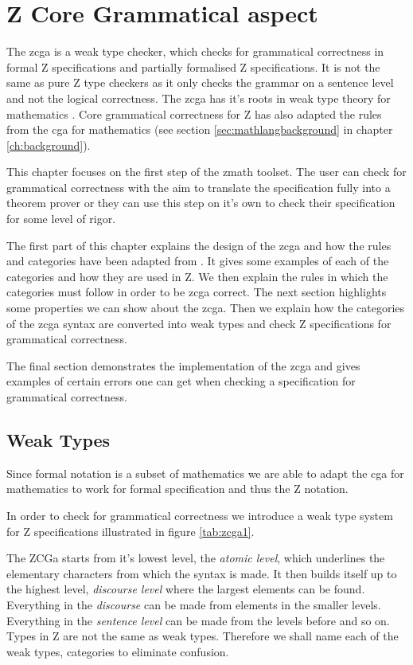 \chapter{Z Core Grammatical aspect}
\label{ch:zcga}

The \gls{zcga} is a weak type checker, which checks for grammatical correctness
in formal Z specifications and partially formalised Z specifications. It is not
the same as pure Z type checkers as it only checks the grammar on a sentence
level and not the logical correctness. The \gls{zcga} has it's roots in weak
type theory for mathematics \cite{wtt}. Core grammatical correctness for Z has
also adapted the rules from the \gls{cga} for mathematics (see section
\ref{sec:mathlangbackground} in chapter \ref{ch:background}).

This chapter focuses on the first step of the \gls{zmath} toolset. The user can
check for grammatical correctness with the aim to translate the specification
fully into a theorem prover or they can use this step on it's own to check their
specification for some level of rigor.

The first part of this chapter explains the design of the \gls{zcga} and how the
rules and categories have been adapted from \cite{wtt}. It gives some examples
of each of the categories and how they are used in Z. We then explain the rules
in which the categories must follow in order to be \gls{zcga} correct. The next
section highlights some properties we can show about the \gls{zcga}. Then we
explain how the categories of the \gls{zcga} syntax are converted into weak
types and check Z specifications for grammatical correctness.

The final section demonstrates the implementation of the \gls{zcga} and gives
examples of certain errors one can get when checking a specification for
grammatical correctness.

\section{Weak Types}

Since formal notation is a subset of mathematics we are able to adapt the
\gls{cga} for mathematics to work for formal specification and thus the Z
notation.

In order to check for grammatical correctness we introduce a weak type system
for Z specifications illustrated in figure \ref{tab:zcga1}.
 
The ZCGa starts from it's lowest level, the \emph{atomic level}, which
underlines the elementary characters from which the syntax is made. It then
builds itself up to the highest level, \emph{discourse level} where the largest
elements can be found. Everything in the \emph{discourse} can be made from
elements in the smaller levels. Everything in the \emph{sentence level} can be
made from the levels before and so on. Types in Z are not the same as weak
types. Therefore we shall name each of the weak types, categories to eliminate
confusion.

